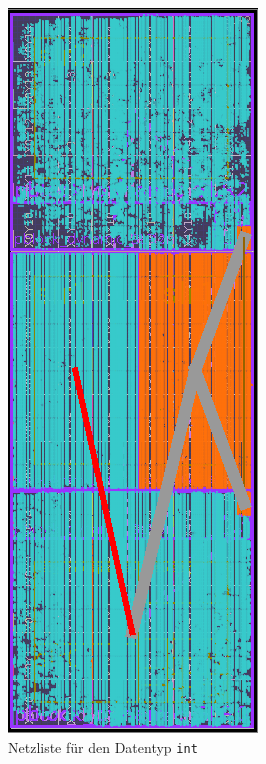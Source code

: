 \begin{figure}[htb]
    \centering
    \begin{minipage}{0.45\textwidth}
        \centering
        \includegraphics{box_res_int.png}
        \caption*{Netzliste für den Datentyp \texttt{int}}
    \end{minipage}\hfill
    \begin{minipage}{0.45\textwidth}
        \centering

\end{minipage}
\end{figure}

